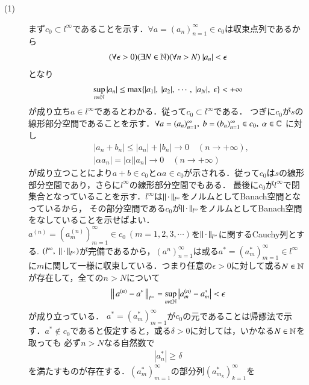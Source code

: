 \begin{prf}\mbox{}
\begin{description}
	\item[(1)] まず$c_0 \subset l^{\infty}$であることを示す．$\forall a=(a_n)_{n=1}^{\infty} \in c_0$は収束点列であるから
		\begin{align}
			(\forall \epsilon > 0)(\exists N \in \mathbb{N})(\forall n > N)\ |a_n| < \epsilon
		\end{align}
		となり
		\begin{align}
			\sup{n \in \N}{|a_n|} \leq \max{}{\{|a_1|,\ |a_2|,\ \cdots,\ |a_N|,\ \epsilon\}} < +\infty
		\end{align}
		が成り立ち$a \in l^{\infty}$であるとわかる．従って$c_0 \subset l^{\infty}$である．
		つぎに$c_0$が$s$の線形部分空間であることを示す．$\forall a=(a_n)_{n=1}^{\infty},\ b=(b_n)_{n=1}^{\infty} \in c_0,\ \alpha \in \C$
		に対し
		\begin{align}
			&|a_n + b_n| \leq |a_n| + |b_n| \longrightarrow 0 \quad (n \longrightarrow +\infty), \\
			&|\alpha a_n|= |\alpha||a_n| \longrightarrow 0 \quad (n \longrightarrow +\infty)
		\end{align}
		が成り立つことにより$a + b \in c_0$と$\alpha a \in c_0$が示される．従って$c_0$は$s$の線形部分空間であり，さらに$l^{\infty}$の線形部分空間でもある．
		最後に$c_0$が$l^{\infty}$で閉集合となっていることを示す．$l^{\infty}$は$\left\|\, \cdot\, \right\|_{l^{\infty}}$をノルムとしてBanach空間となっているから，
		その部分空間である$c_0$が$\left\|\, \cdot\, \right\|_{l^{\infty}}$をノルムとしてBanach空間をなしていることを示せばよい．
		$a^{(n)} = (a_m^{(n)})_{m=1}^{\infty} \in c_0\ (m=1,2,3,\cdots)$を$\left\|\, \cdot\, \right\|_{l^{\infty}}$に関するCauchy列とする. 
		$(l^{\infty},\ \Norm{\cdot}{l^{\infty}})$が完備であるから，$(a^{n})_{n=1}^{\infty}$は或る$a^{*} = (a_m^{*})_{m=1}^{\infty} \in l^{\infty}$
		に$m$に関して一様に収束している．つまり任意の$\epsilon > 0$に対して或る$N \in \mathbb{N}$が存在して，全ての$n > N$について
		\begin{align}
			\left\|\, a^{(n)} - a^{*}\, \right\|_{l^{\infty}} = \operatorname*{sup}_{m \in \mathbb{N}} \left|a_m^{(n)} - a_m^{*}\right| < \epsilon
		\end{align}
		が成り立っている．
		$a^{*} = (a_m^{*})_{m=1}^{\infty}$が$c_0$の元であることは帰謬法で示す．$a^* \notin c_0$であると仮定すると，或る$\delta > 0$に対しては，いかなる$N \in \mathbb{N}$を取っても
		必ず$n > N$なる自然数で
		\begin{align}
			|a_n^*| \geq \delta
		\end{align}
		を満たすものが存在する．$(a_m^*)_{m=1}^{\infty}$の部分列$(a_{m_k}^*)_{k=1}^{\infty}$を

\end{description}
\end{prf}
